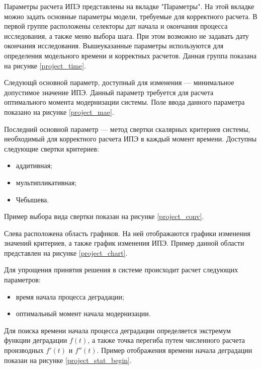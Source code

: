 Параметры расчета ИПЭ представлены на вкладке "Параметры".
На этой вкладке можно задать основные параметры модели, требуемые для корректного расчета. 
В первой группе расположены селекторы дат начала и окончания процесса исследования, а также меню выбора шага.
При этом возможно не задавать дату окончания исследования.
Вышеуказанные параметры используются для определения модельного времени и корректных расчетов. 
Данная группа показана на рисунке \ref{project_time}.


Следующй основной параметр, доступный для изменения --- минимальное допустимое значение ИПЭ. 
Данный параметр требуется для расчета оптимального момента модернизации системы.
Поле ввода данного параметра показано на рисунке \ref{project_mae}.


Последний основной параметр --- метод свертки скалярных критериев системы, необходимый для корректного расчета ИПЭ в каждый момент времени.
Доступны следующие свертки критериев:
\begin{itemize}
    \item аддитивная;
    \item мультипликативная;
    \item Чебышева.
\end{itemize}

Пример выбора вида свертки показан на рисунке \ref{project_conv}.


Слева расположена область графиков. На ней отображаются графики изменения значений критериев,
а также график изменения ИПЭ. Пример данной области представлен на рисунке \ref{project_chart}.


Для упрощения принятия решения в системе происходит расчет следующих параметров:
\begin{itemize}
    \item время начала процесса деградации;
    \item оптимальный момент начала модернизации.
\end{itemize}

Для поиска времени начала процесса деградации определяется экстремум функции деградации $f(t)$, 
а также точка перегиба путем численного расчета производных $f'(t)$ и $f''(t)$.
Пример отображения времени начала деградации показан на рисунке \ref{project_stat_begin}.

